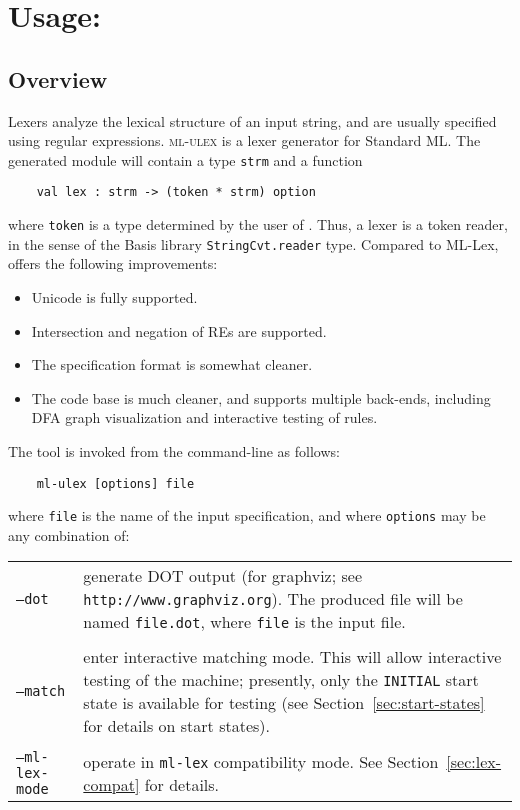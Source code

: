 \chapter[\ulex]{Usage: \ulex}

\section{Overview}

Lexers analyze the lexical structure of an input string, and are usually specified using regular expressions.  \textsc{ml-ulex} is a lexer generator for Standard ML.  The generated module will contain a type {\tt strm} and a function
\begin{verbatim}
    val lex : strm -> (token * strm) option
\end{verbatim}
where {\tt token} is a type determined by the user of \ulex{}.  Thus, a lexer is a token reader, in the sense of the Basis library {\tt StringCvt.reader} type.  Compared to ML-Lex, \ulex{} offers the following improvements:
\begin{itemize}
 \item Unicode is fully supported.
 \item Intersection and negation of REs are supported.
 \item The specification format is somewhat cleaner.
 \item The code base is much cleaner, and supports multiple back-ends, including DFA graph visualization and interactive testing of rules.
\end{itemize}
The tool is invoked from the command-line as follows:
\begin{verbatim}
    ml-ulex [options] file
\end{verbatim}
where {\tt file} is the name of the input \ulex{} specification, and where {\tt options} may be any combination of:

\vskip 12pt
\begin{tabular}{lp{}}
  {\tt --dot} & generate DOT output (for graphviz; see \texttt{http://www.graphviz.org}).  The produced file will be named {\tt file.dot}, where {\tt file} is the input file. \\
  \\
  {\tt --match} & enter interactive matching mode.  This will allow interactive testing of the machine; presently, only the {\tt INITIAL} start state is available for testing (see Section~\ref{sec:start-states} for details on start states).  \\
  \\
  {\tt --ml-lex-mode} & operate in {\tt ml-lex} compatibility mode.  See Section~\ref{sec:lex-compat} for details.
\end{tabular}

